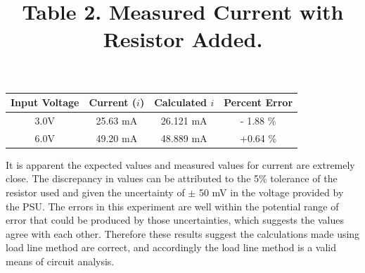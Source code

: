 \documentclass[12pt]{article}
\begin{document}
\begin{center}
 \title{\textbf{Table 2.} Measured Current with Resistor Added.}\vspace{6pt}
 \begin{tabular}{|c|c|c|c|}
   \hline 
   Input Voltage & Current ($i$) & Calculated $i$ & Percent Error \\ 
   \hline 
   3.0V & 25.63 mA & 26.121 mA & - 1.88 \% \\ 
   \hline 
   6.0V & 49.20 mA & 48.889 mA & +0.64  \% \\ 
   \hline 
 \end{tabular} 
\end{center}
%
It is apparent the expected values and measured values for current are extremely close. The discrepancy in values can be attributed to the 5\% tolerance of the resistor used and given the uncertainty of $\pm$ 50 mV in the voltage provided by the PSU. The errors in this experiment are well within the potential range of error that could be produced by those uncertainties, which suggests the values agree with each other. Therefore these results suggest the calculations made using load line method are correct, and accordingly the load line method is a valid means of circuit analysis.
\end{document}
